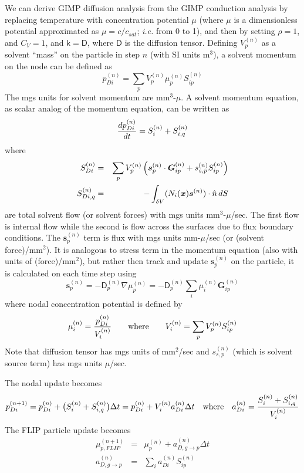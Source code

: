 \documentclass[11pt]{article}
\renewcommand{\vec}[1]{\boldsymbol{#1}}
\newcommand{\tens}[1]{\boldsymbol{\mathsf{#1}}}
\begin{document}
We can derive GIMP diffusion analysis from the GIMP conduction analysis by replacing temperature with concentration potential $\mu$ (where $\mu$ is a dimensionless potential approximated as $\mu=c/c_{sat}$; {\em i.e.} from 0 to 1), and then by setting $\rho=1$, and $C_V=1$, and $\tens k = \tens D$, where $\tens D$ is the diffusion tensor. Defining $V_{p}^{(n)}$ as a solvent ``mass'' on the particle in step $n$ (with SI units m$^3$), a solvent momentum on the node can be defined as
\begin{equation}
      p_{Di}^{(n)} = \sum_p  V_{p}^{(n)} \mu_p^{(n)} S^{(n)}_{ip} 
\end{equation}
The mgs units for solvent momentum are mm$^3$-$\mu$. A solvent momentum equation, as scalar analog of the momentum equation, can be written as
\begin{equation}
     {d p_{Di}^{(n)}\over dt} = S_{i}^{(n)} + S_{i,q}^{(n)}
\end{equation}
where
\begin{eqnarray}
     S_{Di}^{(n)} & = & \sum_p V_p^{(n)}  \left(\vec s_p^{(n)}\cdot \vec G^{(n)}_{ip}  + s_{s,p}^{(n)} S^{(n)}_{ip} \right) \\
     S_{Di,q}^{(n)} & = & -  \int_{\delta V} (N_i(\vec x)\vec s^{(n)})\cdot \hat n \thinspace dS 
\end{eqnarray}
are total solvent flow (or solvent forces) with mgs units mm$^3$-$\mu$/sec. The first flow is internal flow while the second is flow across the surfaces due to flux boundary conditions. The $\vec s_p^{(n)}$ term is flux with mgs units mm-$\mu$/sec (or (solvent force)/mm$^2$). It is analogous to stress term in the momentum equation (also with units of (force)/mm$^2$), but rather then track and update $\vec s_p^{(n)}$ on the particle, it is calculated on each time step using
\begin{equation}
    \vec s_p^{(n)} = - \tens D_p^{(n)} \nabla \mu_p^{(n)} = - \tens D_p^{(n)}\sum_i \tens  \mu_i^{(n)} \vec G^{(n)}_{ip}
\end{equation}
where nodal concentration potential is defined by
\begin{equation}
       \mu_i^{(n)} = {p_{Di}^{(n)} \over V_{i}^{(n)}} \qquad {\rm where } \qquad V_{i}^{(n)} = \sum_p  V_{p}^{(n)} S^{(n)}_{ip}  
\end{equation}
Note that diffusion tensor has mgs units of mm$^2$/sec and $s_{s,p}^{(n)}$ (which is solvent source term) has mgs units $\mu$/sec.

The nodal update becomes
\begin{equation}
     p_{Di}^{(n+1)} = p_{Di}^{(n)} +  \bigl(S_{i}^{(n)} + S_{i,q}^{(n)}\bigr)\Delta t = p_{Di}^{(n)} +  V_{i}^{(n)} a_{Di}^{(n)}\Delta t
     \quad{\rm where}\quad
     a_{Di}^{(n)} =  { S_{i}^{(n)} + S_{i,q}^{(n)}  \over V_{i}^{(n)}}
\end{equation}
The FLIP particle update becomes
\begin{eqnarray}
     \mu_{p,FLIP}^{(n+1)}  & = & \mu_p^{(n)} + a_{D,g\to p}^{(n)}\Delta t   \\
      a_{D,g\to p}^{(n)} & = & \sum_i a_{Di}^{(n)} S_{ip}^{(n)}    \\
\end{eqnarray}
\end{document}
